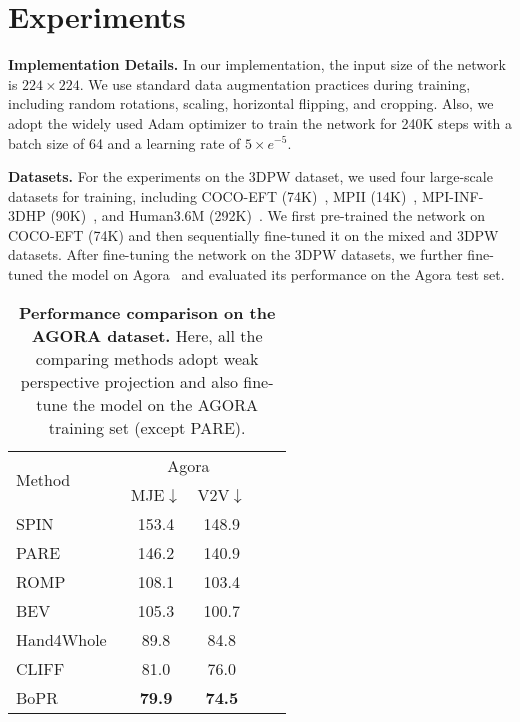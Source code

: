 \documentclass[10pt,twocolumn,letterpaper]{article}
\begin{document}
\section{Experiments}

\noindent\textbf{Implementation Details.}
In our implementation, the input size of the network is $224 \times 224$. We use standard data augmentation practices during training, including random rotations, scaling, horizontal flipping, and cropping. Also, we adopt the widely used Adam optimizer to train the network for 240K steps with a batch size of 64 and a learning rate of $5 \times e^{-5}$. 



\noindent\textbf{Datasets.}
For the experiments on the 3DPW dataset, we used four large-scale datasets for training, including COCO-EFT (74K)~\cite{lin2014microsoft}, MPII (14K)~\cite{andriluka20142d}, MPI-INF-3DHP (90K)~\cite{mehta2017monocular}, and Human3.6M (292K)~\cite{ionescu2013human3}. We first pre-trained the network on COCO-EFT (74K) and then sequentially fine-tuned it on the mixed and 3DPW datasets. After fine-tuning the network on the 3DPW datasets, we further fine-tuned the model on Agora~\cite{patel2021agora} and evaluated its performance on the Agora test set.




\begin{table}
\centering
\begin{tabular}{lcccc}
\toprule[1.5pt]
\multirow{2}{*}{Method} & \multicolumn{2}{c}{Agora}  \\ 
 & MJE$\downarrow$  & V2V$\downarrow$  \\ \hline
SPIN~\cite{kolotouros2019learning} & 153.4 & 148.9 \\ 
PARE~\cite{kocabas2021pare} & 146.2 & 140.9 \\ 
ROMP~\cite{sun2021monocular} & 108.1 & 103.4 \\
BEV~\cite{sun2022putting} & 105.3 & 100.7 \\ 
Hand4Whole~\cite{sun2022putting} & 89.8 & 84.8 \\ 
CLIFF~\cite{li2022cliff} & 81.0 & 76.0 \\ 
\hline
BoPR & \textbf{79.9} & \textbf{74.5}  \\ \bottomrule[1.5pt]
\end{tabular}
\caption{\textbf{Performance comparison on the AGORA dataset.} Here, all the comparing methods adopt weak perspective projection and also fine-tune the model on the AGORA training set (except PARE).}
\label{tab:agora}
\end{table}
\end{document}
